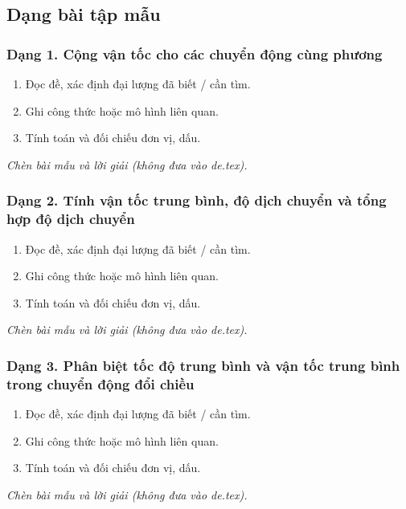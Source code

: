 

\subsection{Dạng bài tập mẫu}
\subsubsection{Dạng 1. Cộng vận tốc cho các chuyển động cùng phương}
\begin{phuongphap}
\begin{enumerate}
\item Đọc đề, xác định đại lượng đã biết / cần tìm.
\item Ghi công thức hoặc mô hình liên quan.
\item Tính toán và đối chiếu đơn vị, dấu.
\end{enumerate}
\end{phuongphap}
\begin{vidumau}
\textit{Chèn bài mẫu và lời giải (không đưa vào de.tex).}
\end{vidumau}

\subsubsection{Dạng 2. Tính vận tốc trung bình, độ dịch chuyển và tổng hợp độ dịch chuyển}
\begin{phuongphap}
\begin{enumerate}
\item Đọc đề, xác định đại lượng đã biết / cần tìm.
\item Ghi công thức hoặc mô hình liên quan.
\item Tính toán và đối chiếu đơn vị, dấu.
\end{enumerate}
\end{phuongphap}
\begin{vidumau}
\textit{Chèn bài mẫu và lời giải (không đưa vào de.tex).}
\end{vidumau}

\subsubsection{Dạng 3. Phân biệt tốc độ trung bình và vận tốc trung bình trong chuyển động đổi chiều}
\begin{phuongphap}
\begin{enumerate}
\item Đọc đề, xác định đại lượng đã biết / cần tìm.
\item Ghi công thức hoặc mô hình liên quan.
\item Tính toán và đối chiếu đơn vị, dấu.
\end{enumerate}
\end{phuongphap}
\begin{vidumau}
\textit{Chèn bài mẫu và lời giải (không đưa vào de.tex).}
\end{vidumau}

